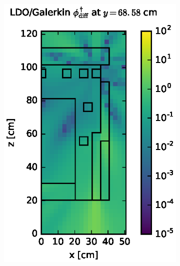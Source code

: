 \begin{figure}[!htb]
\begin{subfigure}{0.4\textwidth}
\includegraphics[max height=0.445\textheight]
{img/dlvn-plots/cad-adj/flux-diff-rel-gkn04.eps}
\end{subfigure}
\\
\begin{subfigure}{0.4\textwidth}

\end{subfigure}
\end{figure}
